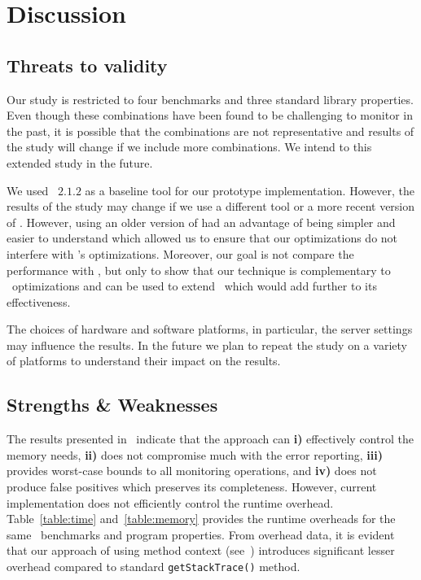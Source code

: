 \section{Discussion}
\label{sec:discussion}

\subsection{Threats to validity}
\label{sec:discussion:ttv}

Our study is restricted to four \dacapo benchmarks and three \java standard
library properties. Even though these combinations have been found to be
challenging to monitor in the past, it is possible that the combinations are not
representative and results of the study will change if we include more
combinations. We intend to this extended study in the future.

We used \javamop\ $2.1.2$ as a baseline tool for our prototype implementation. 
However, the results of the study may change if we use a different tool or a 
more recent version of \javamop. However, using an older version of \javamop had 
an advantage of being simpler and easier to understand which allowed us to 
ensure that our optimizations do not interfere with \javamop's optimizations. 
Moreover, our goal is not compare the performance with \javamop, but only to show 
that our technique is complementary to \javamop\ optimizations and can be used to 
extend \javamop\ which would add further to its effectiveness.

The choices of hardware and software platforms, in particular, the server 
settings may influence the results. In the future we plan to repeat the study on 
a variety of platforms to understand their impact on the results.

\subsection{Strengths \& Weaknesses}
\label{sec:discussion:snw}

The results presented in~ indicate that the approach can 
\textbf{i)} effectively control the memory needs, \textbf{ii)} does not
compromise much with the error reporting, \textbf{iii)} provides worst-case
bounds to all monitoring operations, and \textbf{iv)} does not produce false
positives which preserves its completeness.
However, current implementation does not efficiently control the runtime 
overhead. Table~\ref{table:time} and~\ref{table:memory} provides the runtime
overheads for the same \dacapo\ benchmarks and program properties. From overhead
data, it is evident that our approach of using method context
(see~) introduces significant lesser overhead compared to
standard \texttt{getStackTrace()} method.

